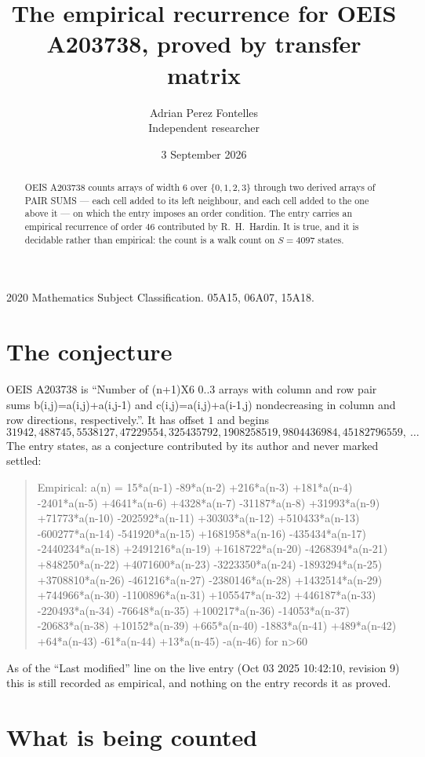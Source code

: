 \documentclass[11pt,a4paper]{article}
\title{The empirical recurrence for OEIS A203738, proved by transfer matrix}
\author{Adrian Perez Fontelles\\ \small Independent researcher}
\date{3 September 2026}
\theoremstyle{plain}
\theoremstyle{definition}
\begin{document}
\maketitle

\begin{abstract}
OEIS A203738 counts arrays of width $6$ over $\{0,1,2,3\}$ through two derived arrays of PAIR SUMS ---
each cell added to its left neighbour, and each cell added to the one above it --- on which the
entry imposes an order condition. The entry carries an empirical recurrence of order $46$
contributed by R.~H.~Hardin. It is true, and it is decidable rather than empirical: the count is
a walk count on $S=4097$ states.
\end{abstract}

\noindent\small 2020 Mathematics Subject Classification. 05A15, 06A07, 15A18.\normalsize

\section{The conjecture}

OEIS A203738 is ``Number of (n+1)X6 0..3 arrays with column and row pair sums b(i,j)=a(i,j)+a(i,j-1) and c(i,j)=a(i,j)+a(i-1,j) nondecreasing in column and row directions, respectively.''. It has offset $1$ and begins
\[
31942, 488745, 5538127, 47229554, 325435792, 1908258519, 9804436984, 45182796559,\ \dots
\]
The entry states, as a conjecture contributed by its author and never marked settled:
\begin{quote}
Empirical: a(n) = 15*a(n-1) -89*a(n-2) +216*a(n-3) +181*a(n-4) -2401*a(n-5) +4641*a(n-6) +4328*a(n-7) -31187*a(n-8) +31993*a(n-9) +71773*a(n-10) -202592*a(n-11) +30303*a(n-12) +510433*a(n-13) -600277*a(n-14) -541920*a(n-15) +1681958*a(n-16) -435434*a(n-17) -2440234*a(n-18) +2491216*a(n-19) +1618722*a(n-20) -4268394*a(n-21) +848250*a(n-22) +4071600*a(n-23) -3223350*a(n-24) -1893294*a(n-25) +3708810*a(n-26) -461216*a(n-27) -2380146*a(n-28) +1432514*a(n-29) +744966*a(n-30) -1100896*a(n-31) +105547*a(n-32) +446187*a(n-33) -220493*a(n-34) -76648*a(n-35) +100217*a(n-36) -14053*a(n-37) -20683*a(n-38) +10152*a(n-39) +665*a(n-40) -1883*a(n-41) +489*a(n-42) +64*a(n-43) -61*a(n-44) +13*a(n-45) -a(n-46) for n>60
\end{quote}
As of the ``Last modified'' line on the live entry (Oct 03 2025 10:42:10, revision 9) this is still
recorded as empirical, and nothing on the entry records it as proved.

\section{What is being counted}
\end{document}
